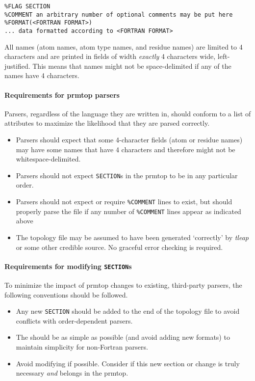 \begin{verbatim}
%FLAG SECTION
%COMMENT an arbitrary number of optional comments may be put here
%FORMAT(<FORTRAN FORMAT>)
... data formatted according to <FORTRAN FORMAT>
\end{verbatim}

All names (\eg atom names, atom type names, and residue names) are limited to
4 characters and are printed in fields of width \emph{exactly} 4 characters
wide, left-justified. This means that names might not be space-delimited if any
of the names have 4 characters.

\paragraph{Requirements for prmtop parsers}

Parsers, regardless of the language they are written in, should conform to a
list of attributes to maximize the likelihood that they are parsed correctly.

\begin{itemize}
   \item Parsers should expect that some 4-character fields (\eg atom or residue
         names) may have some names that have 4 characters and therefore might
         not be whitespace-delimited.
   \item Parsers should not expect {\tt SECTION}s in the prmtop to be in any
         particular order.
   \item Parsers should not expect or require {\tt \%COMMENT} lines to exist,
         but should properly parse the file if any number of {\tt \%COMMENT}
         lines appear as indicated above
   \item The topology file may be assumed to have been generated `correctly' by
         \emph{tleap} or some other credible source. No graceful error checking
         is required.
\end{itemize}

\paragraph{Requirements for modifying {\tt SECTION}s}

To minimize the impact of prmtop changes to existing, third-party parsers, the
following conventions should be followed.

\begin{itemize}
   \item Any new {\tt SECTION} should be added to the end of the topology file to
         avoid conflicts with order-dependent parsers.
   \item The {\tt <FORTRAN FORMAT>} should be as simple as possible (and avoid
         adding new formats) to maintain simplicity for non-Fortran parsers.
   \item Avoid modifying if possible. Consider if this new section or change is
         truly necessary \emph{and} belongs in the prmtop.
\end{itemize}


